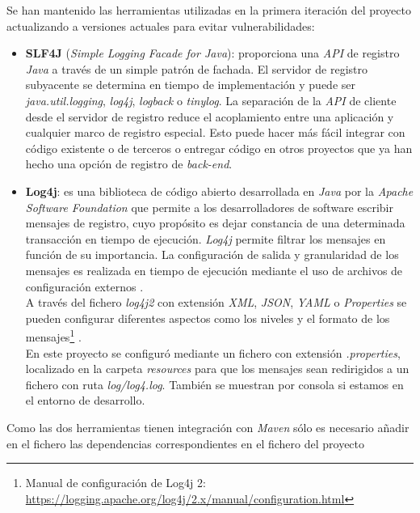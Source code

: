 Se han mantenido las herramientas utilizadas en la primera iteración del proyecto \cite{TFGPrevio} actualizando a versiones actuales para evitar vulnerabilidades:
\begin{itemize}
	\item \textbf{SLF4J} (\textit{Simple Logging Facade for Java}): proporciona una \textit{API} de registro \textit{Java} a través de un simple patrón de fachada. El servidor de registro subyacente se determina en tiempo de implementación y puede ser \textit{java.util.logging}, \textit{log4j}, \textit{logback} o \textit{tinylog}. La separación de la \textit{API} de cliente desde el servidor de registro reduce el acoplamiento entre una aplicación y cualquier marco de registro especial. Esto puede hacer más fácil integrar con código existente o de terceros o entregar código en otros proyectos que ya han hecho una opción de registro de \textit{back-end}\cite{SLF4J_wiki}.

	\item\textbf{Log4j}: es una biblioteca de código abierto desarrollada en \textit{Java} por la \textit{Apache Software Foundation} que permite a los desarrolladores de software escribir mensajes de registro, cuyo propósito es dejar constancia de una determinada transacción en tiempo de ejecución. \textit{Log4j} permite filtrar los mensajes en función de su importancia. La configuración de salida y granularidad de los mensajes es realizada en tiempo de ejecución mediante el uso de archivos de configuración externos \cite{Log4j_wiki}. 
	\\A través del fichero \textit{log4j2} con extensión \textit{XML}, \textit{JSON}, \textit{YAML} o \textit{Properties} se pueden configurar diferentes aspectos como los niveles y el formato de los mensajes\footnote{Manual de configuración de Log4j 2: \url{https://logging.apache.org/log4j/2.x/manual/configuration.html}} \cite{apache_apache_nodate}. 
	\\En este proyecto se configuró mediante un fichero con extensión \textit{.properties}, localizado en la carpeta \textit{resources}  para que los mensajes sean redirigidos a un fichero con ruta \textit{log/log4.log}. También se muestran por consola si estamos en el entorno de desarrollo.	
\end{itemize}

Como las dos herramientas tienen integración con \textit{Maven} sólo es necesario añadir en el fichero  las dependencias correspondientes en el fichero  del proyecto


